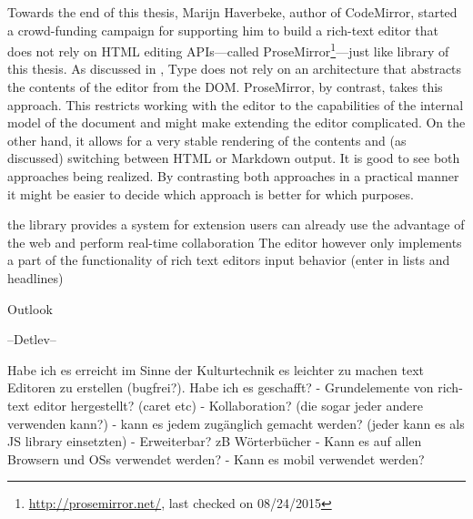 Towards the end of this thesis, Marijn Haverbeke, author of CodeMirror, started a crowd-funding campaign for supporting him to build a rich-text editor that does not rely on HTML editing APIs---called ProseMirror\footnote{\url{http://prosemirror.net/}, last checked on 08/24/2015}---just like library of this thesis. As discussed in , Type does not rely on an architecture that abstracts the contents of the editor from the DOM. ProseMirror, by contrast, takes this approach. This restricts working with the editor to the capabilities of the internal model of the document and might make extending the editor complicated. On the other hand, it allows for a very stable rendering of the contents and (as discussed) switching between HTML or Markdown output. It is good to see both approaches being realized. By contrasting both approaches in a practical manner it might be easier to decide which approach is better for which purposes.



\iffalse



the library provides a system for extension
users can already use the advantage of the web and perform real-time collaboration
The editor however only implements a part of the functionality of rich text editors
input behavior (enter in lists and headlines)

Outlook

--Detlev--

Habe ich es erreicht im Sinne der Kulturtechnik es leichter zu machen text Editoren zu erstellen (bugfrei?).
Habe ich es geschafft?
 - Grundelemente von rich-text editor hergestellt? (caret etc)
 - Kollaboration? (die sogar jeder andere verwenden kann?)
 - kann es jedem zugänglich gemacht werden? (jeder kann es als JS library einsetzten)
 - Erweiterbar? zB Wörterbücher
 - Kann es auf allen Browsern und OSs verwendet werden?
 - Kann es mobil verwendet werden?




